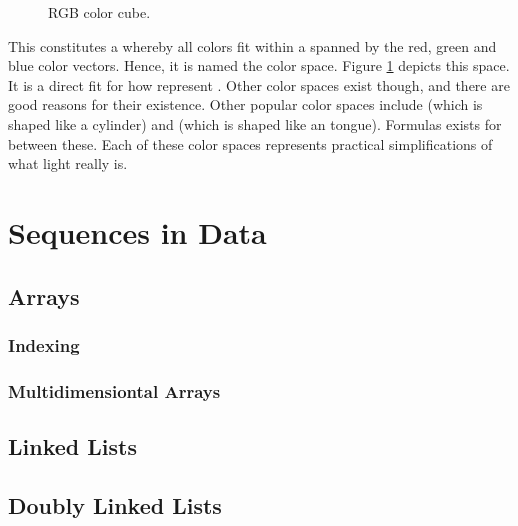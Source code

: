 \begin{figure}[tbp]
  
  \caption{RGB color cube.}
  \label{fig:primdata:struct:color}
\end{figure}

This constitutes a  whereby all colors fit within a  spanned by the red, green and blue color vectors. Hence, it is named the  color space. Figure \ref{fig:primdata:struct:color} depicts this space. It is a direct fit for how  represent . Other color spaces exist though, and there are good reasons for their existence. Other popular color spaces include  (which is shaped like a cylinder) and  (which is shaped like an tongue). Formulas exists for  between these. Each of these color spaces represents practical simplifications of what light really is.

\csharpsubsection{\csharp}


\section{Sequences in Data}

\subsection{Arrays}

\subsubsection{Indexing}


\subsubsection{Multidimensiontal Arrays}

\subsection{Linked Lists}


\subsection{Doubly Linked Lists}

